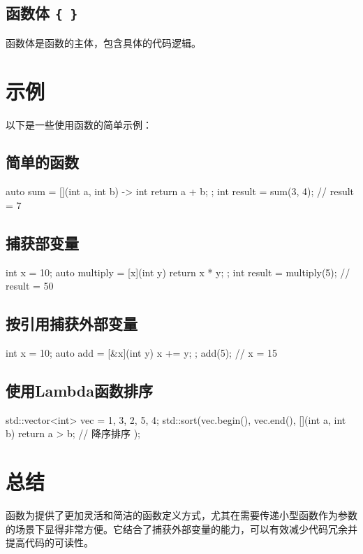 \subsection{函数体 \texttt{\{ \}}}
函数体是函数的主体，包含具体的代码逻辑。

\section{示例}
以下是一些使用函数的简单示例：

\subsection[简单的Lambda函数]{简单的函数}
\begin{cpplst}
auto sum = [](int a, int b) -> int {
    return a + b;
};
int result = sum(3, 4);  // result = 7
\end{cpplst}

\subsection{捕获部变量}
\begin{cpplst}
int x = 10;
auto multiply = [x](int y) {
    return x * y;
};
int result = multiply(5);  // result = 50
\end{cpplst}

\subsection{按引用捕获外部变量}
\begin{cpplst}
int x = 10;
auto add = [&x](int y) {
    x += y;
};
add(5);  // x = 15
\end{cpplst}

\subsection{使用Lambda函数排序}
\begin{cpplst}
std::vector<int> vec = {1, 3, 2, 5, 4};
std::sort(vec.begin(), vec.end(), [](int a, int b) {
    return a > b;  // 降序排序
});
\end{cpplst}

\section{总结}
函数为提供了更加灵活和简洁的函数定义方式，尤其在需要传递小型函数作为参数的场景下显得非常方便。它结合了捕获外部变量的能力，可以有效减少代码冗余并提高代码的可读性。
